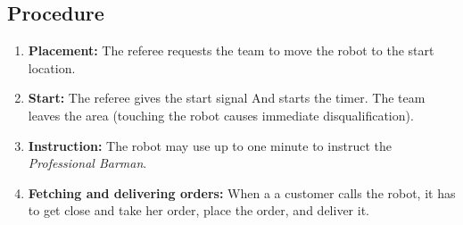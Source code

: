 \subsection{Procedure}
\begin{enumerate}[nosep]
	\item \textbf{Placement:} The referee requests the team to move the robot to the start location.
	\item \textbf{Start:} The referee gives the start signal And starts the timer. The team leaves the area (touching the robot causes immediate disqualification).
	\item \textbf{Instruction:} The robot may use up to one minute to instruct the \textit{Professional Barman}.
	\item \textbf{Fetching and delivering orders:} When a a customer calls the robot, it has to get close and take her order, place the order, and deliver it.
\end{enumerate}


